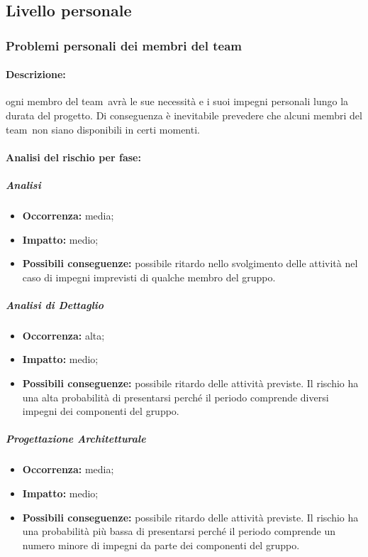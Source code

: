 \documentclass[../PianoProgetto.tex]{subfiles}
\begin{document}
\newpage
\subsection{Livello personale}

\subsubsection{Problemi personali dei membri del team}
\label{sec:Problemi personali dei membri del team}

	\paragraph*{Descrizione:} ogni membro del team\g\ avrà le sue necessità e i suoi impegni personali lungo la durata del progetto. Di conseguenza è inevitabile prevedere che alcuni membri del team\g\ non siano disponibili in certi momenti.
	 
	\paragraph*{Analisi del rischio per fase:} 

		\subparagraph*{Analisi}
			\begin{itemize}[label={-}]
				\item \textbf{Occorrenza:} media;
				\item \textbf{Impatto:} medio;
				\item \textbf{Possibili conseguenze:} possibile ritardo nello svolgimento delle attività nel caso di impegni imprevisti di qualche membro del gruppo.
			\end{itemize}
			
		\subparagraph*{Analisi di Dettaglio}
			\begin{itemize}[label={-}]
				\item \textbf{Occorrenza:} alta;
				\item \textbf{Impatto:} medio;
				\item \textbf{Possibili conseguenze:} possibile ritardo delle attività previste. Il rischio ha una alta probabilità di presentarsi perché il periodo comprende diversi impegni dei componenti del gruppo.
			\end{itemize}
			
		\subparagraph*{Progettazione Architetturale}
			\begin{itemize}[label={-}]
				\item \textbf{Occorrenza:} media;
				\item \textbf{Impatto:} medio;
				\item \textbf{Possibili conseguenze:} possibile ritardo delle attività previste. Il rischio ha una probabilità più bassa di presentarsi perché il periodo comprende un numero minore di impegni da parte dei componenti del gruppo.
			\end{itemize}
			
\end{document}

